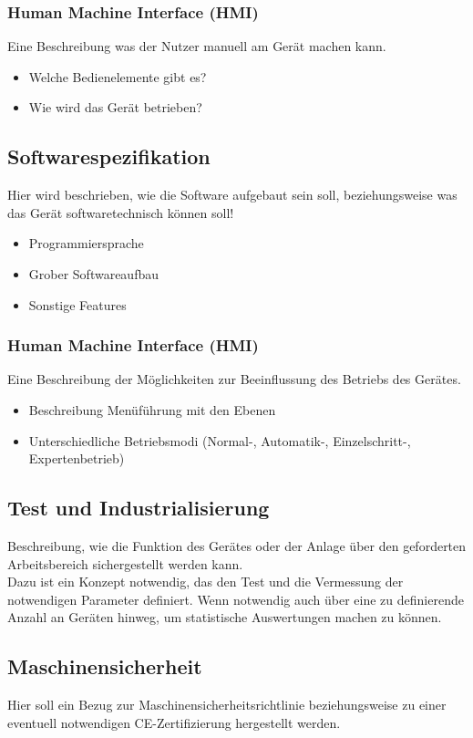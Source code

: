 \documentclass[12pt, draft]{article}
\begin{document}
\subsubsection{Human Machine Interface (HMI)}
Eine Beschreibung was der Nutzer manuell am Gerät machen kann.
\begin{itemize}
    \item Welche Bedienelemente gibt es?
    \item Wie wird das Gerät betrieben?
\end{itemize}

\subsection{Softwarespezifikation}
Hier wird beschrieben, wie die Software aufgebaut sein soll, beziehungsweise was das Gerät softwaretechnisch können soll!
\begin{itemize}
    \item Programmiersprache
    \item Grober Softwareaufbau
    \item Sonstige Features
\end{itemize}

\subsubsection{Human Machine Interface (HMI)}
Eine Beschreibung der Möglichkeiten zur Beeinflussung des Betriebs des Gerätes.
\begin{itemize}
    \item Beschreibung Menüführung mit den Ebenen
    \item Unterschiedliche Betriebsmodi (Normal-, Automatik-, Einzelschritt-, Expertenbetrieb)
\end{itemize}

\subsection{Test und Industrialisierung}
Beschreibung, wie die Funktion des Gerätes oder der Anlage über den geforderten Arbeitsbereich sichergestellt werden kann. \\
Dazu ist ein Konzept notwendig, das den Test und die Vermessung der notwendigen Parameter definiert.
Wenn notwendig auch über eine zu definierende Anzahl an Geräten hinweg, um statistische Auswertungen machen zu können.

\subsection{Maschinensicherheit}
Hier soll ein Bezug zur Maschinensicherheitsrichtlinie beziehungsweise zu einer eventuell notwendigen CE-Zertifizierung hergestellt werden.
\end{document}
